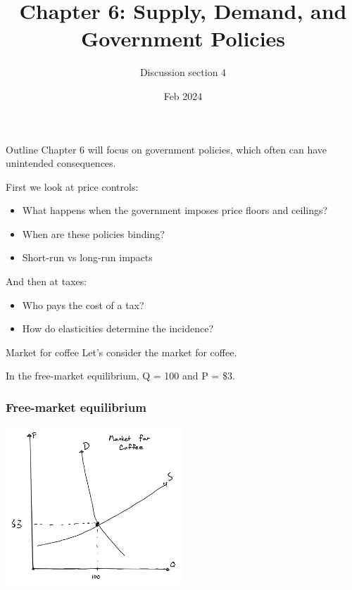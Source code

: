 \documentclass[aspectratio=169]{beamer}
\title{Chapter 6: Supply, Demand, and Government Policies}
\author{Discussion section 4}
\date{Feb 2024}
\begin{document}
\begin{frame}
    \titlepage 
\end{frame}

\begin{frame}{Outline}
    Chapter 6 will focus on government policies, which often can have unintended consequences. 

    First we look at price controls:
    
    \begin{itemize}
        \item What happens when the government imposes price floors and ceilings?
        \item When are these policies binding?
        \item Short-run vs long-run impacts
    \end{itemize}

    And then at taxes:

    \begin{itemize}
        \item Who pays the cost of a tax?
        \item How do elasticities determine the incidence?
    \end{itemize}
\end{frame}

\begin{frame}{Market for coffee}
    Let's consider the market for coffee.

    \vspace{5mm}

    In the free-market equilibrium, Q = 100 and P = \$3.
\end{frame}

\begin{frame}
    \frametitle{Free-market equilibrium}
    \centering
    \includegraphics[width = 0.5\textwidth,keepaspectratio]{coffee_eq.png}
\end{frame}
\end{document}
